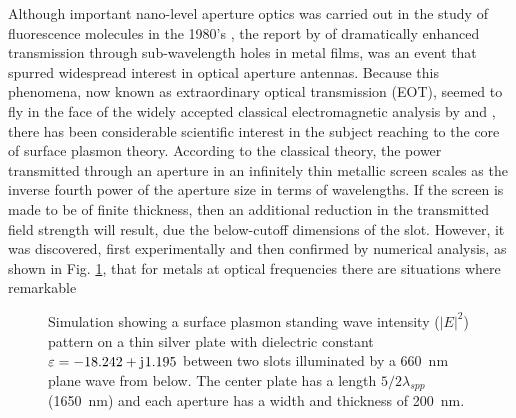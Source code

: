 \documentclass[11pt]{article}
\begin{document}
Although important nano-level aperture optics was carried out in the study of fluorescence molecules in the 1980's \cite{Fischer1986}, the report by \cite{Ebbesen1998} of dramatically enhanced transmission through sub-wavelength holes in metal films, was an event that spurred widespread interest in optical aperture antennas. Because this phenomena, now known as extraordinary optical transmission (EOT), seemed to fly in the face of the widely accepted classical electromagnetic analysis by \cite{Bethe1944} and \cite{Bouwkamp1950}, there has been considerable scientific interest in the subject reaching to the core of surface plasmon theory. According to the classical theory, the power transmitted through an aperture in an infinitely thin metallic screen scales as the inverse fourth power of the aperture size in terms of wavelengths. If the screen is made to be of finite thickness, then an additional reduction in the transmitted field strength will result, due the below-cutoff dimensions of the slot. However, it was discovered, first experimentally and then confirmed by
numerical analysis, as shown in Fig. \ref{fig:cst_simulation}, that for metals at optical frequencies there are situations where remarkable
%
\begin{figure}[h!]
  \centering
  \caption{Simulation showing a surface plasmon standing wave intensity ($|E|^2$) pattern on a thin silver plate with dielectric constant $\varepsilon= -18.242 + \mathrm{j}\mkern1mu 1.195$ between two slots illuminated by a \SI{660}{\nano\metre} plane wave from below. The center plate has a length $5/2 \lambda_{spp}$ (\SI{1650}{\nano\metre}) and each aperture has a width and thickness of \SI{200}{\nano\metre}.}
  \label{fig:cst_simulation}
\end{figure}
\end{document}
